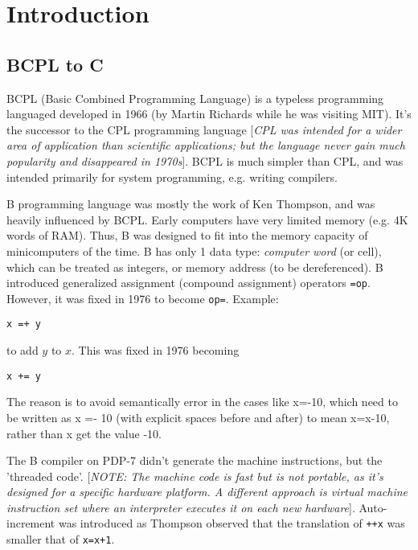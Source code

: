 
\chapter{Introduction}
\label{chap:introduction}


\section{BCPL to C}
\label{sec:BCPL_C}

BCPL (Basic Combined Programming Language) is a typeless programming languaged
developed in 1966 (by Martin Richards while he was visiting MIT). It's the
successor to the CPL programming language [{\it CPL was intended for a wider
area of application than scientific applications; but the language never gain much
popularity and disappeared in 1970s}]. BCPL is much simpler than CPL, and was
intended primarily for system programming, e.g.
writing compilers.

B programming language was mostly the work of Ken Thompson, and was heavily
influenced by BCPL. Early computers have very limited memory (e.g. 4K words of
RAM). Thus, B was designed to fit into the memory capacity of minicomputers of
the time. B has only 1 data type: {\it computer word} (or cell), which can be
treated as integers, or memory address (to be dereferenced). B introduced
generalized assignment (compound assignment) operators \verb!=op!. However, it
was fixed in 1976 to become \verb!op=!. Example:
\begin{verbatim}
x =+ y
\end{verbatim}
to add $y$ to $x$. This was fixed in 1976 becoming
\begin{verbatim}
x += y
\end{verbatim}
The reason is to avoid semantically error in the cases like x=-10, which need to
be written as x =- 10 (with explicit spaces before and after) to mean x=x-10,
rather than x get the value -10.

The B compiler on PDP-7 didn't generate the machine instructions, but the
'threaded code'. [{\it NOTE: The machine code is fast but is not portable, as
it's designed for a specific hardware platform. A different approach is virtual
machine instruction set where an interpreter executes it on each new hardware}].
Auto-increment was introduced as Thompson observed that the translation of
\verb!++x! was smaller that of \verb!x=x+1!.

